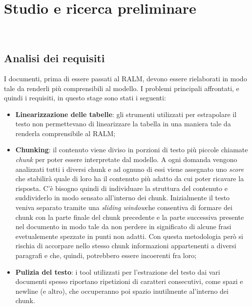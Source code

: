 \chapter{Studio e ricerca preliminare}
\label{cap:analisi-preliminare}

 \\

\section{Analisi dei requisiti}
I documenti, prima di essere passati al RALM, devono essere rielaborati in modo tale da renderli più comprensibili al modello.
I problemi principali affrontati, e quindi i requisiti, in questo stage sono stati i seguenti:
\begin{itemize}
    \item \textbf{Linearizzazione delle tabelle}: gli strumenti utilizzati per estrapolare il testo non permettevano di linearizzare 
    la tabella in una maniera tale da renderla comprensibile al RALM;
    \item \textbf{Chunking}: il contenuto viene diviso in porzioni di testo più piccole chiamate \emph{chunk} per poter essere interpretate dal modello. A ogni domanda vengono analizzati tutti i 
    diversi chunk e ad ognuno di essi viene assegnato uno \emph{score} che stabilirà quale di loro ha il contenuto più adatto da cui poter ricavare la risposta. 
    \noindent C'è bisogno quindi di individuare la struttura del contenuto e suddividerlo in modo sensato all'interno dei chunk.
    Inizialmente il testo veniva separato tramite una \emph{\gls{sliding window}}\glsfirstoccur che consentiva di formare dei chunk con la parte finale del chunk precedente e la parte successiva presente nel documento in modo tale da non perdere in significato di alcune frasi evetualemente spezzate in punti non adatti.
    \noindent Con questa metodologia però si rischia di accorpare nello stesso chunk informazioni appartenenti a diversi paragrafi e che, quindi, potrebbero essere incoerenti fra loro;
    \item \textbf{Pulizia del testo}: i tool utilizzati per l'estrazione del testo dai vari documenti spesso riportano ripetizioni di caratteri consecutivi, come spazi e newline (e altro), che occuperanno poi spazio inutilmente al'interno dei chunk.
\end{itemize}

